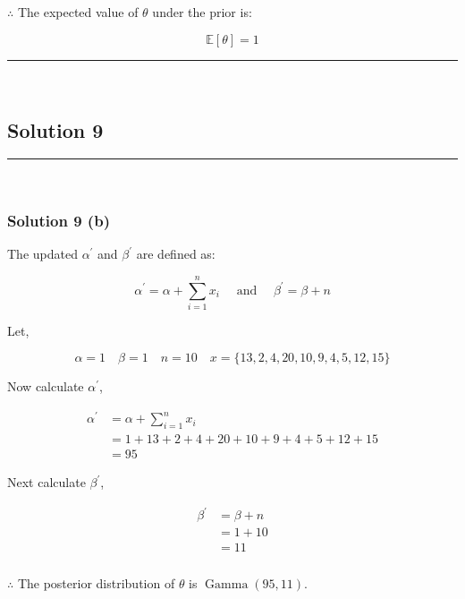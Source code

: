 \documentclass{article}
\begin{document}
\subsubsection*{\normalfont}{$\therefore$ The expected value of $\theta$ under the prior is:}

$$\mathbb{E}[\theta] = 1$$

\noindent\rule{\textwidth}{0.4pt}\\

\newpage

\subsection*{Solution 9}
\noindent\rule{\textwidth}{0.4pt}\\
\subsubsection*{Solution 9 (b)}
\begin{flushleft}
    The updated $\alpha^{\prime}$ and $\beta^{\prime}$ are defined as:
\end{flushleft}

$$\alpha^{\prime} = \alpha + \sum_{i=1}^n x_i \quad \text{ and } \quad \beta^{\prime} = \beta + n$$

\begin{flushleft}
    Let,
\end{flushleft}

$$\alpha = 1 \quad \beta =1 \quad n =10 \quad x = \{13, 2, 4, 20, 10, 9, 4, 5, 12, 15\} $$
\begin{flushleft}
    Now calculate $\alpha^{\prime}$,
\end{flushleft}
\begin{align*}
    \alpha^{\prime} &= \alpha + \sum_{i=1}^n x_i \\
    &= 1 + 13 + 2 + 4 + 20 + 10 + 9 + 4 + 5 + 12 + 15 \\
    &= 95
\end{align*}
\begin{flushleft}
    Next calculate $\beta^{\prime}$,
\end{flushleft}
\begin{align*}
    \beta^{\prime} &= \beta + n \\
    &= 1 + 10\\
    &= 11
\end{align*}

\subsubsection*{\normalfont}{$\therefore$ The posterior distribution of $\theta$ is $\operatorname{Gamma}(95, 11)$.} \\
\end{document}
